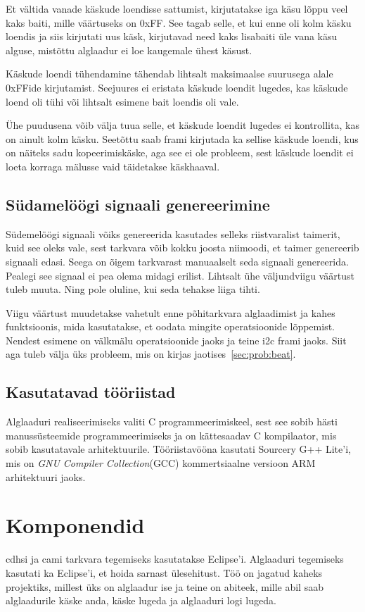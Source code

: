 \documentclass[12pt,a4paper]{article}
\begin{document}
Et vältida vanade käskude loendisse sattumist, kirjutatakse iga käsu lõppu veel
kaks baiti, mille väärtuseks on 0xFF. See tagab selle, et kui enne oli kolm
käsku loendis ja siis kirjutati uus käsk, kirjutavad need kaks lisabaiti üle
vana käsu alguse, mistõttu alglaadur ei loe kaugemale ühest käsust.

Käskude loendi tühendamine tähendab lihtsalt maksimaalse suurusega alale
0xFFide kirjutamist. Seejuures ei eristata käskude loendit lugedes, kas
käskude loend oli tühi või lihtsalt esimene bait loendis oli vale.

Ühe puudusena võib välja tuua selle, et käskude loendit lugedes ei kontrollita,
kas on ainult kolm käsku. Seetõttu saab \gls{fram}i kirjutada ka sellise käskude
loendi, kus on näiteks sadu kopeerimiskäske, aga see ei ole probleem, sest
käskude loendit ei loeta korraga mälusse vaid täidetakse käskhaaval.


\subsection{Südamelöögi signaali genereerimine}
Südemelöögi signaali võiks genereerida kasutades selleks riistvaralist taimerit,
kuid see oleks vale, sest tarkvara võib kokku joosta niimoodi, et taimer
genereerib signaali edasi. Seega on õigem tarkvarast manuaalselt seda signaali
genereerida.  Pealegi see signaal ei pea olema midagi erilist. Lihtsalt ühe
väljundviigu väärtust tuleb muuta. Ning pole oluline, kui seda tehakse liiga
tihti.

Viigu väärtust muudetakse vahetult enne põhitarkvara alglaadimist ja kahes
funktsioonis, mida kasutatakse, et oodata mingite operatsioonide lõppemist.
Nendest esimene on välkmälu operatsioonide jaoks ja teine \gls{i2c} \gls{fram}i jaoks. Siit
aga tuleb välja üks probleem, mis on kirjas jaotises~\ref{sec:prob:beat}. 

\subsection{Kasutatavad tööriistad}
Alglaaduri realiseerimiseks valiti C programmeerimiskeel, sest see sobib hästi
manussüsteemide programmeerimiseks ja on kättesaadav C kompilaator, mis sobib
kasutatavale arhitektuurile. Tööriistavööna kasutati Sourcery G++ Lite'i, mis on
\textit{GNU Compiler Collection}(GCC) kommertsiaalne versioon ARM arhitektuuri
jaoks.

\section{Komponendid}
\Gls{cdhs}i ja \gls{cam}i tarkvara tegemiseks kasutatakse Eclipse'i. Alglaaduri
tegemiseks kasutati ka Eclipse'i, et hoida sarnast ülesehitust. Töö on jagatud
kaheks projektiks, millest üks on alglaadur ise ja teine on abiteek, mille abil
saab alglaadurile käske anda, käske lugeda ja alglaaduri logi lugeda.
\end{document}
